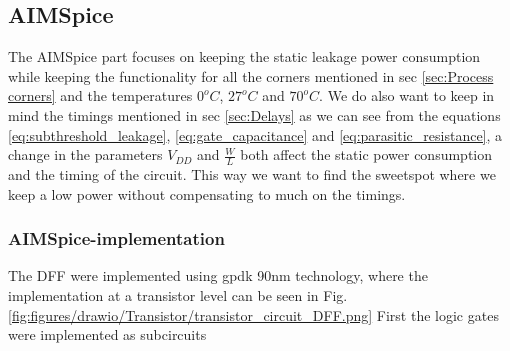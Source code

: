 \subsection{AIMSpice}
The AIMSpice part focuses on keeping the static leakage power consumption while keeping the functionality for all the corners mentioned in sec \ref{sec:Process corners} and the temperatures $0^o C$, $27^o C$ and $70^o C$. We do also want to keep in mind the timings mentioned in sec \ref{sec:Delays} as we can see from the equations \ref{eq:subthreshold_leakage}, \ref{eq:gate_capacitance} and \ref{eq:parasitic_resistance}, a change in the parameters $V_{DD}$ and $\frac{W}{L}$ both affect the static power consumption and the timing of the circuit. This way we want to find the sweetspot where we keep a low power without compensating to much on the timings.

\subsubsection{AIMSpice-implementation}
The DFF were implemented using gpdk 90nm technology, where the implementation at a transistor level can be seen in Fig. \ref{fig:figures/drawio/Transistor/transistor_circuit_DFF.png} First the logic gates were implemented as subcircuits


